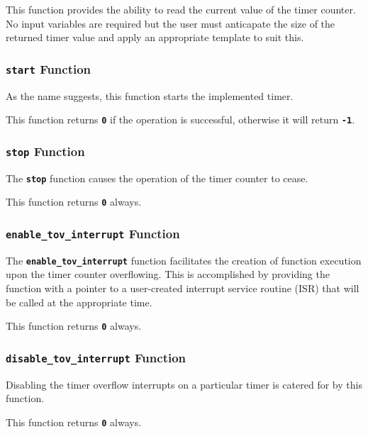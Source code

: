 \documentclass[a4paper, oneside, 11pt, titlepage, onecolumn, openright]{article}
\begin{document}
			This function provides the ability to read the current value of the timer counter. No input variables are required but the user must anticapate the size of the returned timer value and apply an appropriate template to suit this.
			
\subsubsection{\textbf{\texttt{start}} Function}
			\label{sss:HALtcstartFunction}
			
			As the name suggests, this function starts the implemented timer.
			
			This function returns \textbf{\texttt{0}} if the operation is successful, otherwise it will return \textbf{\texttt{-1}}. 
						
\subsubsection{\textbf{\texttt{stop}} Function}
			\label{sss:HALtcstopFunction}
			
			The \textbf{\texttt{stop}} function causes the operation of the timer counter to cease.
			
			This function returns \textbf{\texttt{0}} always.
			
\subsubsection{\textbf{\texttt{enable\_tov\_interrupt}} Function}
			\label{sss:HALtcenable_tov_interruptFunction}
			
			The \textbf{\texttt{enable\_tov\_interrupt}} function facilitates the creation of function execution upon the timer counter overflowing. This is accomplished by providing the function with a pointer to a user-created interrupt service routine (ISR) that will be called at the appropriate time.
			
			This function returns \textbf{\texttt{0}} always.
			
\subsubsection{\textbf{\texttt{disable\_tov\_interrupt}} Function}
			\label{sss:HALtcdisable_tov_interruptFunction}
			
 			Disabling the timer overflow interrupts on a particular timer is catered for by this function. 
			
			This function returns \textbf{\texttt{0}} always.
			
\end{document}
